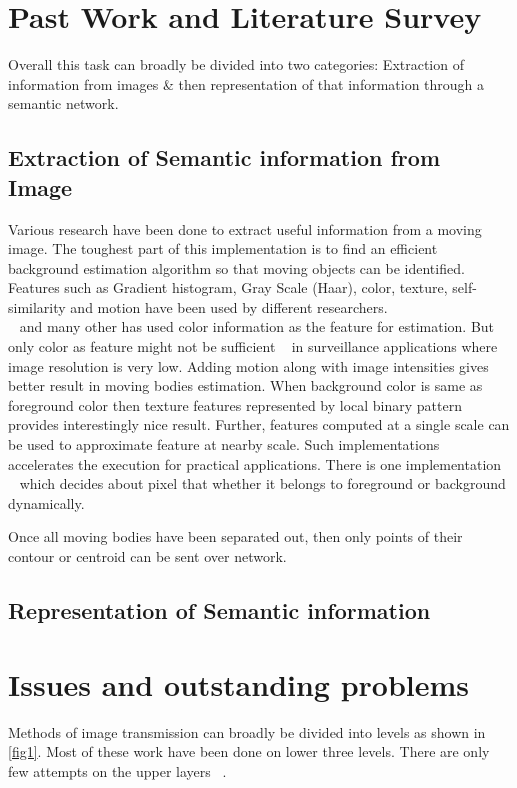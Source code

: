\section{Past Work and Literature Survey}

Overall this task can broadly be divided into two categories: Extraction
of information from images \& then representation of that information
through a semantic network.

\subsection{Extraction of Semantic information from Image}

Various research have been done to extract useful information from a
moving image. The toughest part of this implementation is to find an
efficient background estimation algorithm so that moving objects can be
identified. Features such as Gradient histogram, Gray Scale (Haar),
color, texture, self-similarity and motion have been used by different
researchers. \\ 
 ~\cite{1} and many other has used color information as the feature for
estimation. But only color as feature might not be sufficient ~\cite{2}
in surveillance applications where image resolution is very low.  Adding
motion along with image intensities gives better result in moving bodies
estimation. When background color is same as foreground color then
texture features represented by local binary pattern ~\cite{3} provides
interestingly nice result. Further, features computed at a single scale
can be used to approximate feature at nearby scale. Such implementations
~\cite{4} accelerates the execution for practical applications.
There is one implementation ~\cite{5} which decides about pixel that
whether it belongs to foreground or background dynamically.

Once all moving bodies have been separated out, then only points of
their contour or centroid can be sent over network.

\subsection{Representation of Semantic information}

\section{Issues and outstanding problems}

Methods of image transmission can broadly be divided into levels as shown
in \ref{fig1}. Most of these work have been done on lower three levels.
There are only few attempts on the upper layers ~\cite{6,7}.

